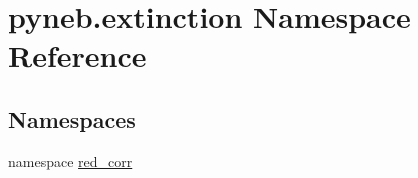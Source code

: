 \hypertarget{namespacepyneb_1_1extinction}{\section{pyneb.\-extinction Namespace Reference}
\label{namespacepyneb_1_1extinction}
}
\subsection*{Namespaces}
\begin{DoxyCompactItemize}
\item 
namespace \hyperlink{namespacepyneb_1_1extinction_1_1red__corr}{red\-\_\-corr}
\end{DoxyCompactItemize}

